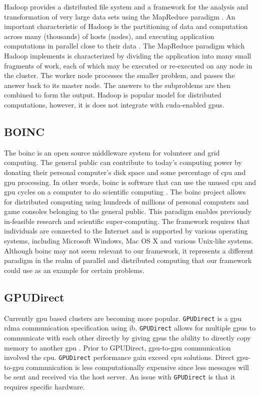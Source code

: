Hadoop provides a distributed file system and a framework
for the analysis and transformation of very large data sets using the MapReduce
paradigm \cite{website:Apache-Hadoop} \cite{website:Apress} \cite{dias2011hpc}
\cite{dean2001mapreduce}. An important characteristic of Hadoop is the
partitioning of data and computation across many (thousands) of hosts (nodes),
and executing application computations in parallel close to their data
\cite{shvachko2011apache}. The MapReduce \cite{luo2011hierarchical}
\cite{website:Hadoop-Wiki-map} paradigm which Hadoop implements is
characterized by dividing the application into many small fragments of work,
each of which may be executed or re-executed on any node in the cluster. The
worker node processes the smaller problem, and passes the answer back to its
master node. The answers to the subproblems are then combined to form the
output. Hadoop is popular model for distributed computations, however, it is
does not integrate with \gls{cuda}-enabled \glspl{gpu}.

\subsection{BOINC}

The \Gls{boinc} is an open source middleware system for volunteer and grid
computing. The general public can contribute to today's computing power by
donating their personal computer's disk space and some percentage of \gls{cpu}
and \gls{gpu} processing. In other words, \gls{boinc} is software that can use
the unused \gls{cpu} and \gls{gpu} cycles on a computer to do scientific
computing \cite{anderson2004boinc}. The \gls{boinc} project allows for
distributed computing using hundreds of millions of personal computers and game
consoles belonging to the general public. This paradigm enables previously
in-feasible research and scientific super-computing. The framework requires
that individuals are connected to the Internet and is supported by various
operating systems, including Microsoft Windows, Mac OS X and various Unix-like
systems. Although \Gls{boinc} may not seem relevant to our framework, it
represents a different paradigm in the realm of parallel and distributed
computing that our framework could use as an example for certain problems.

\subsection{GPUDirect}

Currently \gls{gpu} based clusters are becoming more popular.
\texttt{GPUDirect} is a \gls{gpu} \gls{rdma} communication specification using
\gls{ib}. \texttt{GPUDirect} allows for multiple \glspl{gpu} to communicate
with each other directly by giving \glspl{gpu} the ability to directly copy
memory to another \gls{gpu} \cite{website:youtube_gpudirect}. Prior to
GPUDirect, \gls{gpu}-to-\gls{gpu} communication involved the \gls{cpu}.
\texttt{GPUDirect} performance gain exceed \gls{cpu} solutions. Direct
\gls{gpu}-to-\gls{gpu} communication is less computationally expensive since
less messages will be sent and received via the host server. An issue with
\texttt{GPUDirect} is that it requires specific hardware.

